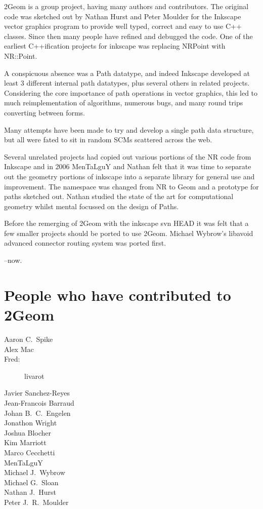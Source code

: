 \documentclass[openany]{book}
\begin{document}
2Geom is a group project, having many authors and contributors.  The
original code was sketched out by Nathan Hurst and Peter Moulder for
the Inkscape vector graphics program to provide well typed, correct
and easy to use C++ classes.  Since then many people have refined and
debugged the code.  One of the earliest C++ification projects for
inkscape was replacing NRPoint with NR::Point.

A conspicuous absence was a Path datatype, and indeed Inkscape
developed at least 3 different internal path datatypes, plus several
others in related projects.  Considering the core importance of path
operations in vector graphics, this led to much reimplementation of
algorithms, numerous bugs, and many round trips converting between
forms.

Many attempts have been made to try and develop a single path data
structure, but all were fated to sit in random SCMs scattered across
the web.

Several unrelated projects had copied out various portions of the NR
code from Inkscape and in 2006 MenTaLguY and Nathan felt that it was
time to separate out the geometry portions of inkscape into a
separate library for general use and improvement.  The namespace was
changed from NR to Geom and a prototype for paths sketched out.
Nathan studied the state of the art for computational geometry whilst
mental focussed on the design of Paths.

Before the remerging of 2Geom with the inkscape svn HEAD it was felt
that a few smaller projects should be ported to use 2Geom.  Michael
Wybrow's libavoid advanced connector routing system was ported first.

--now.

\pagebreak

\section{People who have contributed to 2Geom}
\begin{description}
\item[Aaron C.\ Spike]
\item[Alex Mac]
\item[Fred:] livarot
\item[Javier Sanchez-Reyes]
\item[Jean-Francois Barraud]
\item[Johan B.\ C.\ Engelen]
\item[Jonathon Wright]
\item[Joshua Blocher]
\item[Kim Marriott]
\item[Marco Cecchetti]
\item[MenTaLguY]
\item[Michael J.\ Wybrow]
\item[Michael G.\ Sloan]
\item[Nathan J.\ Hurst]
\item[Peter J.\ R.\ Moulder]
\end{description}
\end{document}
